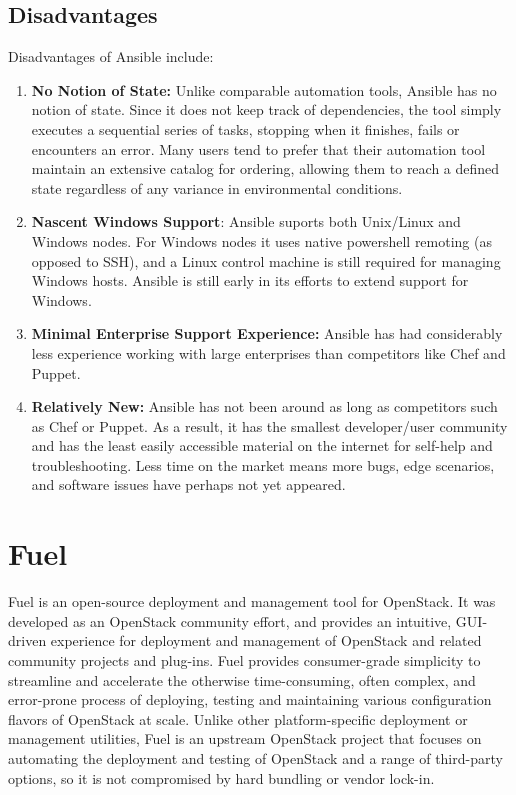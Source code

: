 \documentclass[a4paper, 12pt]{article}
\begin{document}
\subsection{Disadvantages}
Disadvantages of Ansible include:
\begin{enumerate}
\item
\textbf{No Notion of State:} Unlike comparable automation tools, Ansible has no notion of state. Since it does not keep track of dependencies, the tool simply executes a sequential series of tasks, stopping when it finishes, fails or encounters an error. Many users tend to prefer that their automation tool maintain an extensive catalog for ordering, allowing them to reach a defined state regardless of any variance in environmental conditions.
\item
\textbf{Nascent Windows Support}: Ansible suports both Unix/Linux and Windows nodes. For Windows nodes it uses native powershell remoting (as opposed to SSH), and a Linux control machine is still required for managing Windows hosts. Ansible is still early in its efforts to extend support for Windows. 
\item
\textbf{Minimal Enterprise Support Experience:} Ansible has had considerably less experience working with large enterprises than competitors like Chef and Puppet. 
\item
\textbf{Relatively New:} Ansible has not been around as long as competitors such as Chef or Puppet. As a result, it has the smallest developer/user community and has the least easily accessible material on the internet for self-help and troubleshooting. Less time on the market means more bugs, edge scenarios, and software issues have perhaps not yet appeared. 
\end{enumerate}


\newpage
\section{Fuel}
Fuel is an open-source deployment and management tool for OpenStack. It was developed as an OpenStack community effort, and provides an intuitive, GUI-driven experience for deployment and management of OpenStack and related community projects and plug-ins.
Fuel provides consumer-grade simplicity to streamline and accelerate the otherwise time-consuming, often complex, and error-prone process of deploying, testing and maintaining various configuration flavors of OpenStack at scale. Unlike other platform-specific deployment or management utilities, Fuel is an upstream OpenStack project that focuses on automating the deployment and testing of OpenStack and a range of third-party options, so it is not compromised by hard bundling or vendor lock-in.
\end{document}

